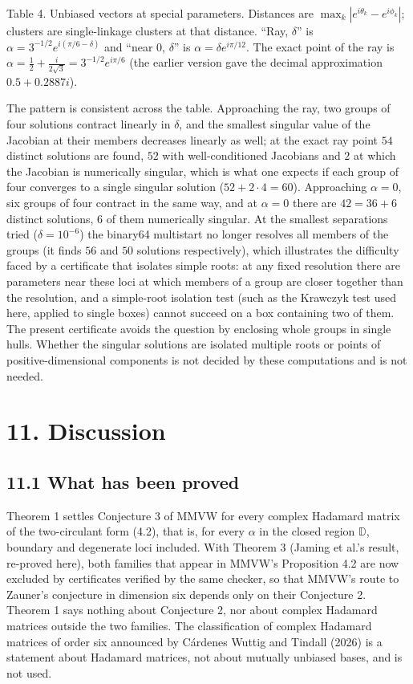 \documentclass[
  11pt,
]{article}
\begin{document}
Table 4. Unbiased vectors at special parameters. Distances are
\(\max_k|e^{i\theta_k}-e^{i\phi_k}|\); clusters are single-linkage
clusters at that distance. ``Ray, \(\delta\)'' is
\(\alpha=3^{-1/2}e^{i(\pi/6-\delta)}\) and ``near \(0\), \(\delta\)'' is
\(\alpha=\delta e^{i\pi/12}\). The exact point of the ray is
\(\alpha=\tfrac12+\tfrac{i}{2\sqrt3}=3^{-1/2}e^{i\pi/6}\) (the earlier
version gave the decimal approximation \(0.5+0.2887i\)).

The pattern is consistent across the table. Approaching the ray, two
groups of four solutions contract linearly in \(\delta\), and the
smallest singular value of the Jacobian at their members decreases
linearly as well; at the exact ray point \(54\) distinct solutions are
found, \(52\) with well-conditioned Jacobians and \(2\) at which the
Jacobian is numerically singular, which is what one expects if each
group of four converges to a single singular solution
(\(52+2\cdot4=60\)). Approaching \(\alpha=0\), six groups of four
contract in the same way, and at \(\alpha=0\) there are \(42=36+6\)
distinct solutions, \(6\) of them numerically singular. At the smallest
separations tried (\(\delta=10^{-6}\)) the binary64 multistart no longer
resolves all members of the groups (it finds \(56\) and \(50\) solutions
respectively), which illustrates the difficulty faced by a certificate
that isolates simple roots: at any fixed resolution there are parameters
near these loci at which members of a group are closer together than the
resolution, and a simple-root isolation test (such as the Krawczyk test
used here, applied to single boxes) cannot succeed on a box containing
two of them. The present certificate avoids the question by enclosing
whole groups in single hulls. Whether the singular solutions are
isolated multiple roots or points of positive-dimensional components is
not decided by these computations and is not needed.

\section{11. Discussion}\label{discussion}

\subsection{11.1 What has been proved}\label{what-has-been-proved}

Theorem 1 settles Conjecture 3 of MMVW for every complex Hadamard matrix
of the two-circulant form (4.2), that is, for every \(\alpha\) in the
closed region \(\mathbb D\), boundary and degenerate loci included. With
Theorem 3 (Jaming et al.'s result, re-proved here), both families that
appear in MMVW's Proposition 4.2 are now excluded by certificates
verified by the same checker, so that MMVW's route to Zauner's
conjecture in dimension six depends only on their Conjecture 2. Theorem
1 says nothing about Conjecture 2, nor about complex Hadamard matrices
outside the two families. The classification of complex Hadamard
matrices of order six announced by Cárdenes Wuttig and Tindall (2026) is
a statement about Hadamard matrices, not about mutually unbiased bases,
and is not used.
\end{document}
